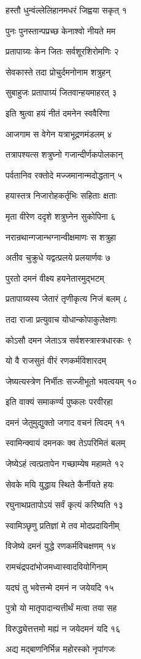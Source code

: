 हस्तौ धुन्वंल्लेलिहानमधरं जिह्वया सकृत् १

पुनः पुनस्तान्पप्रच्छ केनाश्वो नीयते मम

प्रतापाग्र्यः केन जितः सर्वशूरशिरोमणिः २

सेवकास्ते तदा प्रोचुर्दमनोनाम शत्रुहन्

सुबाहुजः प्रतापाग्र्यं जितवान्हयमाहरत् ३

इति श्रुत्वा हयं नीतं दमनेन स्ववैरिणा

आजगाम स वेगेन यत्राभूद्रणमंडलम् ४

तत्रापश्यत्स शत्रुघ्नो गजान्दीर्णकपोलकान्

पर्वतानिव रक्तोदे मज्जमानान्मदोद्धतान् ५

हयास्तत्र निजारोहकर्तृभिः सहिताः क्षताः

मृता वीरेण ददृशे शत्रुघ्नेन सुकोपिना ६

नरान्रथान्गजान्भग्नान्वीक्षमाणः स शत्रुहा

अतीव चुक्रुधे यद्वत्प्रलये प्रलयार्णवः ७

पुरतो दमनं वीक्ष्य हयनेतारमुद्भटम्

प्रतापाग्र्यस्य जेतारं तृणीकृत्य निजं बलम् ८

तदा राजा प्रत्युवाच योधान्कोपाकुलेक्षणः

कोऽसौ दमन जेताऽत्र सर्वशस्त्रास्त्रधारकः ९

यो वै राजसुतं वीरं रणकर्मविशारदम्

जेष्यत्यस्त्रेण निर्भीतः सज्जीभूतो भवत्वयम् १०

इति वाक्यं समाकर्ण्य पुष्कलः परवीरहा

दमनं जेतुमुद्युक्तो जगाद वचनं त्विदम् ११

स्वामिन्क्वायं दमनकः क्व तेऽपरिमितं बलम्

जेष्येऽहं त्वत्प्रतापेन गच्छाम्येष महामते १२

सेवके मयि युद्धाय स्थिते कैर्नीयते हयः

रघुनाथप्रतापोऽयं सर्वं कृत्यं करिष्यति १३

स्वामिञ्छृणु प्रतिज्ञां मे तव मोदप्रदायिनीम्

विजेष्ये दमनं युद्धे रणकर्मविचक्षणम् १४

रामचंद्रपदांभोजमध्वास्वादवियोगिनाम्

यदघं तु भवेत्तन्मे दमनं न जयेयदि १५

पुत्रो यो मातृपादान्यत्तीर्थं मत्वा तया सह

विरुद्ध्येत्तत्तमो मह्यं न जयेदमनं यदि १६

अद्य मद्बाणनिर्भिन्न महोरस्को नृपांगजः

